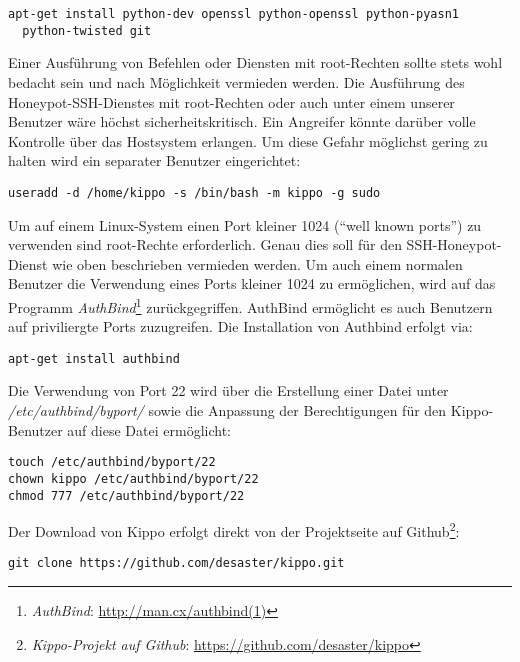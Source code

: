 \begin{lstlisting}[style=customc]
apt-get install python-dev openssl python-openssl python-pyasn1 
  python-twisted git
\end{lstlisting}

Einer Ausführung von Befehlen oder Diensten mit root-Rechten sollte stets wohl bedacht sein und nach Möglichkeit vermieden werden. Die Ausführung des Honeypot-SSH-Dienstes mit root-Rechten oder auch unter einem unserer Benutzer wäre höchst sicherheitskritisch. Ein Angreifer könnte darüber volle Kontrolle über das Hostsystem erlangen. Um diese Gefahr möglichst gering zu halten wird ein separater Benutzer eingerichtet:

\begin{lstlisting}[style=customc]
useradd -d /home/kippo -s /bin/bash -m kippo -g sudo
\end{lstlisting}

Um auf einem Linux-System einen Port kleiner 1024 ("`well known ports"') zu verwenden sind root-Rechte erforderlich. Genau dies soll für den SSH-Honeypot-Dienst wie oben beschrieben vermieden werden. Um auch einem normalen Benutzer die Verwendung eines Ports kleiner 1024 zu ermöglichen, wird auf das Programm \textit{AuthBind}\footnote{ \textit{AuthBind}: \url{http://man.cx/authbind(1)}} zurückgegriffen. AuthBind ermöglicht es auch Benutzern auf priviliergte Ports zuzugreifen. Die Installation von Authbind erfolgt via:

\begin{lstlisting}[style=customc]
apt-get install authbind
\end{lstlisting}

Die Verwendung von Port 22 wird über die Erstellung einer Datei unter \textit{/etc/authbind/byport/} sowie die Anpassung der Berechtigungen für den Kippo-Benutzer auf diese Datei ermöglicht:

\begin{lstlisting}[style=customc]
touch /etc/authbind/byport/22
chown kippo /etc/authbind/byport/22
chmod 777 /etc/authbind/byport/22
\end{lstlisting}

Der Download von Kippo erfolgt direkt von der Projektseite auf Github\footnote{ \textit{Kippo-Projekt auf Github}: \url{https://github.com/desaster/kippo}}:

\begin{lstlisting}[style=customc]
git clone https://github.com/desaster/kippo.git
\end{lstlisting}

